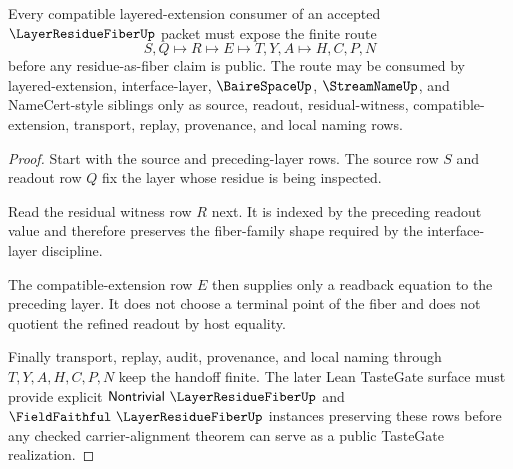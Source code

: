 \begin{theorem}
\label{thm:layer-residue-fiber-extension-handoff}
Every compatible layered-extension consumer of an accepted $\LayerResidueFiberUp$ packet must expose the finite route
$$
S,Q\longmapsto R\longmapsto E\longmapsto T,Y,A\longmapsto H,C,P,N
$$
before any residue-as-fiber claim is public. The route may be consumed by layered-extension, interface-layer, $\BaireSpaceUp$, $\StreamNameUp$, and NameCert-style siblings only as source, readout, residual-witness, compatible-extension, transport, replay, provenance, and local naming rows.
\end{theorem}
\begin{proof}
Start with the source and preceding-layer rows. The source row $S$ and readout row $Q$ fix the layer whose residue is being inspected.

Read the residual witness row $R$ next. It is indexed by the preceding readout value and therefore preserves the fiber-family shape required by the interface-layer discipline.

The compatible-extension row $E$ then supplies only a readback equation to the preceding layer. It does not choose a terminal point of the fiber and does not quotient the refined readout by host equality.

Finally transport, replay, audit, provenance, and local naming through $T,Y,A,H,C,P,N$ keep the handoff finite. The later Lean TasteGate surface must provide explicit $\mathsf{Nontrivial}\ \LayerResidueFiberUp$ and $\FieldFaithful\ \LayerResidueFiberUp$ instances preserving these rows before any checked carrier-alignment theorem can serve as a public TasteGate realization.
\end{proof}





